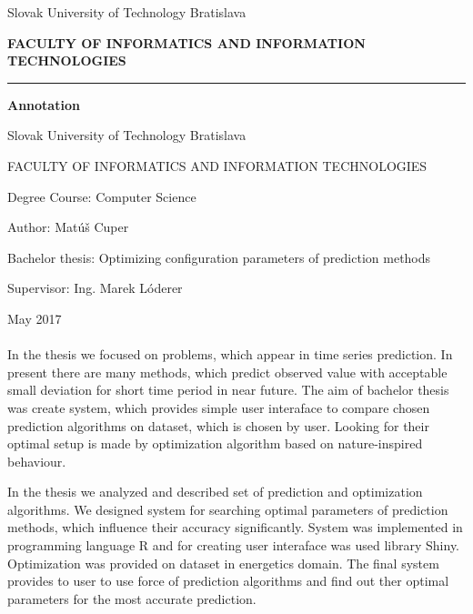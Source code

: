 \documentclass[a4paper,slovak,12pt,appendix]{article}
\begin{document}
\begin{titlepage}
\begin{center}
  {\small Slovak University of Technology Bratislava \par}
  {\small \textbf{FACULTY OF INFORMATICS AND INFORMATION TECHNOLOGIES}}
  \rule{\textwidth}{1pt}

  \vspace*{1.5cm}
  \begin{Large}
    \textbf{Annotation} \par
  \end{Large}
\end{center}
{Slovak University of Technology Bratislava \par}
{FACULTY OF INFORMATICS AND INFORMATION TECHNOLOGIES \par}
{Degree Course: Computer Science \par}
{Author: Matúš Cuper \par}
{Bachelor thesis: Optimizing configuration parameters of prediction methods \par}
{Supervisor: Ing. Marek Lóderer \par}
{May 2017 \\} \\
In the thesis we focused on problems, which appear in time series prediction.
In present there are many methods, which predict observed value with acceptable
small deviation for short time period in near future. The aim of bachelor
thesis was create system, which provides simple user interaface to compare
chosen prediction algorithms on dataset, which is chosen by user. Looking for
their optimal setup is made by optimization algorithm based on nature-inspired
behaviour.

In the thesis we analyzed and described set of prediction and optimization
algorithms. We designed system for searching optimal parameters of prediction
methods, which influence their accuracy significantly. System was implemented
in programming language R and for creating user interaface was used library
Shiny. Optimization was provided on dataset in energetics domain. The final
system provides to user to use force of prediction algorithms and find out
ther optimal parameters for the most accurate prediction.
\end{titlepage}

\end{document}
